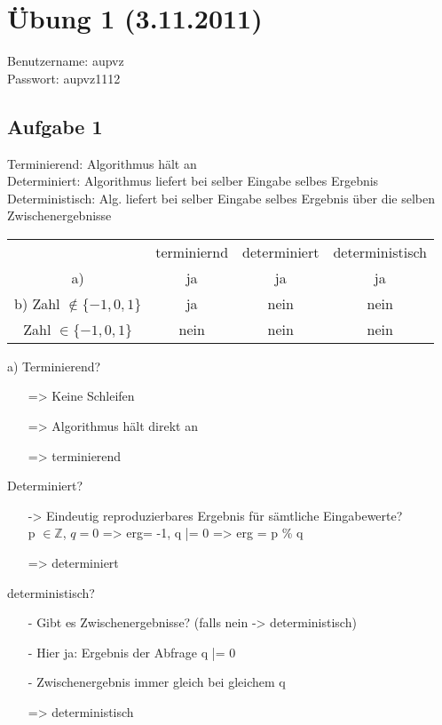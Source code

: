 \section{Übung 1 (3.11.2011)}
Benutzername: aupvz \\
Passwort: aupvz1112 \\
\subsection{Aufgabe 1}
Terminierend: Algorithmus hält an \\
Determiniert: Algorithmus liefert bei selber Eingabe selbes Ergebnis \\
Deterministisch: Alg. liefert bei selber Eingabe selbes Ergebnis über die selben Zwischenergebnisse \\

\begin{table}[h]
\begin{tabular}{c|c|c|c}
	 ~ & terminiernd & determiniert & deterministisch \\
	a) &  ja & ja & ja\\
	b) Zahl $\notin \{-1,0,1\}$ & ja & nein & nein \\ 
	Zahl $\in \{-1,0,1\}$ & nein & nein & nein \\ 
\end{tabular}
\end{table}
a) Terminierend? \\
\begin{itemize}
\item[=>] Keine Schleifen
\item[=>] Algorithmus hält direkt an
\item[=>] terminierend
\end{itemize}

Determiniert? \\
\begin{itemize}
\item[->] Eindeutig reproduzierbares Ergebnis für sämtliche Eingabewerte? \\
 p $\in \mathbb{Z}$, $q=0$ => erg= -1, q |= 0 => erg = p \% q
 \item[=>] determiniert
 \end{itemize}
 
 deterministisch?
\begin{itemize}
 \item[-] Gibt es Zwischenergebnisse? (falls nein -> deterministisch)
 \item[-] Hier ja: Ergebnis der Abfrage q |= 0
 \item[-] Zwischenergebnis immer gleich bei gleichem q
 \item[=>] deterministisch
\end{itemize}

